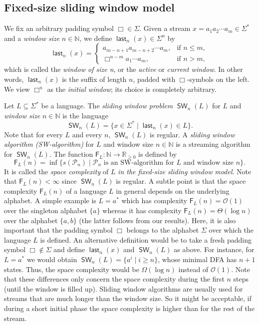 \documentclass{article}\usepackage[a4paper,margin=20mm]{geometry}
\newcommand{\N}{\mathbb{N}}
\renewcommand{\O}{\mathcal{O}}
\renewcommand{\P}{\mathcal{P}}
\newcommand{\F}{\mathsf{F}}
\DeclareMathOperator{\last}{\mathsf{last}}
\DeclareMathOperator{\SW}{\mathsf{SW}}
\renewcommand{\geq}{\geqslant}
\renewcommand{\leq}{\leqslant}
\renewcommand{\ge}{\geq}
\renewcommand{\le}{\leq}
\begin{document}
\subsection{Fixed-size sliding window model} \label{sec-fixed-size}

We fix an arbitrary padding symbol $\Box \in \Sigma$.
Given a stream $x = a_1 a_2 \cdots a_m \in \Sigma^*$ and a {\em window size} $n \in \N$,
we define $\last_n(x) \in \Sigma^n$ by
\[
	\last_n(x) =
	\begin{cases}
		a_{m-n+1} a_{m-n+2} \cdots a_m, & \text{if } n \le m, \\
		\Box^{n-m} a_1 \cdots a_m,         & \text{if } n > m,   
	\end{cases}
\]
which is called the {\em window of size n}, or the {\em active} or {\em current window}.
In other words, $\last_n(x)$ is the suffix of length $n$, padded with $\Box$-symbols on the left.
We view $\Box^n$ as the {\em initial window}; its choice is completely arbitrary.

Let $L \subseteq \Sigma^*$ be a language.
The {\em sliding window problem} $\SW_n(L)$ for $L$ and {\em window size} $n \in \N$
is the language
\[
	\SW_n(L) = \{ x \in \Sigma^* \mid \last_n(x) \in L \}.
\]
Note that for every $L$ and every $n$, $\SW_n(L)$ is regular.
A {\em sliding window algorithm (SW-algorithm)} for $L$ and window size $n \in \N$
is a streaming algorithm for $\SW_n(L)$.
The function $\F_L \colon \N \to \mathbb{R}_{\ge 0}$ is defined by
\begin{equation} \label{def-F_L(n)}
	\F_L(n) = \inf \{ s(\P_n) \mid \P_n \text{ is an SW-algorithm for } L \text{ and window size } n \}.
\end{equation}
It is called the {\em space complexity} of $L$ {\em in the fixed-size sliding window model}.
Note that $\F_L(n) < \infty$ since $\SW_n(L)$ is regular.
A subtle point is that the space complexity $\F_L(n)$ of a language $L$
in general depends on the underlying alphabet.
A simple example is $L = a^*$ which has complexity $\F_L(n) = \O(1)$
over the singleton alphabet $\{a\}$
whereas it has complexity $\F_L(n) = \Theta(\log n)$ over the alphabet $\{a,b\}$
(the latter follows from our results). Here, it is also important that the padding symbol 
$\Box$ belongs to the alphabet $\Sigma$ over which the language $L$ is defined. An alternative
definition would be to take a fresh padding symbol $\Box \notin \Sigma$ and define 
$\last_n(x)$ and $\SW_n(L)$ as above. For instance, for $L = a^*$ we would obtain
$\SW_n(L) = \{ a^i \mid i \geq n\}$, whose minimal DFA has $n+1$ states. Thus, the space complexity
would be $\Omega(\log n)$ instead of $\O(1)$. Note that these differences
only concern the space complexity during the first $n$ steps (until the window is filled up). 
Sliding window algorithms are usually used for streams that are much longer than the window size. So it might be acceptable, if 
during a short initial phase the space complexity is higher than for the rest of the stream.
\end{document}
